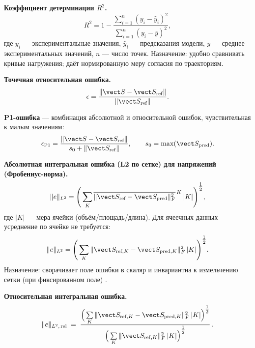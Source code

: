 \textbf{Коэффициент детерминации $R^2$.}
\begin{equation}\label{eq:r_squared}
  R^2 = 1 - \frac{\sum_{i=1}^n (y_i - \hat{y}_i)^2}{\sum_{i=1}^n (y_i - \bar{y})^2},
\end{equation}
где $y_i$ — экспериментальные значения, $\hat{y}_i$ — предсказания модели, $\bar{y}$ — среднее экспериментальных значений, $n$ — число точек. Назначение: удобно сравнивать кривые нагружения; даёт нормированную меру согласия по траекториям.

\textbf{Точечная относительная ошибка.}
\begin{equation}\label{eq:rel_error}
  \epsilon = \frac{\| \vect S - \vect S_{\text{ref}} \|}{\| \vect S_{\text{ref}} \|}.
\end{equation}

\textbf{P1-ошибка} \cite{xie2024p1} — комбинация абсолютной и относительной ошибок, чувствительная к малым значениям:
\begin{equation}\label{eq:p1_error}
  \epsilon_{\mathrm{P1}} = \frac{\| \vect S - \vect S_{\text{ref}} \|}{s_0 + \| \vect S_{\text{ref}} \|},\qquad s_0 = \max(\vect S_{\text{pred}}).
\end{equation}

\textbf{Абсолютная интегральная ошибка (L2 по сетке) для напряжений (Фробениус-норма).}
\begin{equation}\label{eq:l2_abs_stress}
  \|e\|_{L^2} = \Bigg( \sum_{K} \overline{\| \vect S_{\text{ref}} - \vect S_{\text{pred}} \|_F^{2}}^{\,K}\, |K| \Bigg)^{\tfrac12},
\end{equation}
где $|K|$ — мера ячейки (объём/площадь/длина). Для ячеечных данных усреднение по ячейке не требуется:
\begin{equation}\label{eq:l2_abs_stress_cell}
  \|e\|_{L^2} = \Bigg( \sum_{K} \| \vect S_{\text{ref},K} - \vect S_{\text{pred},K} \|_F^{2}\, |K| \Bigg)^{\tfrac12}.
\end{equation}
Назначение: сворачивает поле ошибки в скаляр и инвариантна к измельчению сетки (при фиксированном поле) \cite{BrennerScott2008,AinsworthOden2000,Verfurth2013}.

\textbf{Относительная интегральная ошибка.}
\begin{equation}\label{eq:l2_rel_stress}
  \|e\|_{L^2,\,\mathrm{rel}}\;=\; \frac{\Big( \sum\limits_{K} 
  \| \vect S_{\mathrm{ref},K} - \vect S_{\mathrm{pred},K} \|_F^{2}\, |K| \Big)^{\tfrac12}}
  {\Big( \sum\limits_{K} \| \vect S_{\mathrm{ref},K} \|_F^{2}\, |K| \Big)^{\tfrac12}}\,.
\end{equation}


